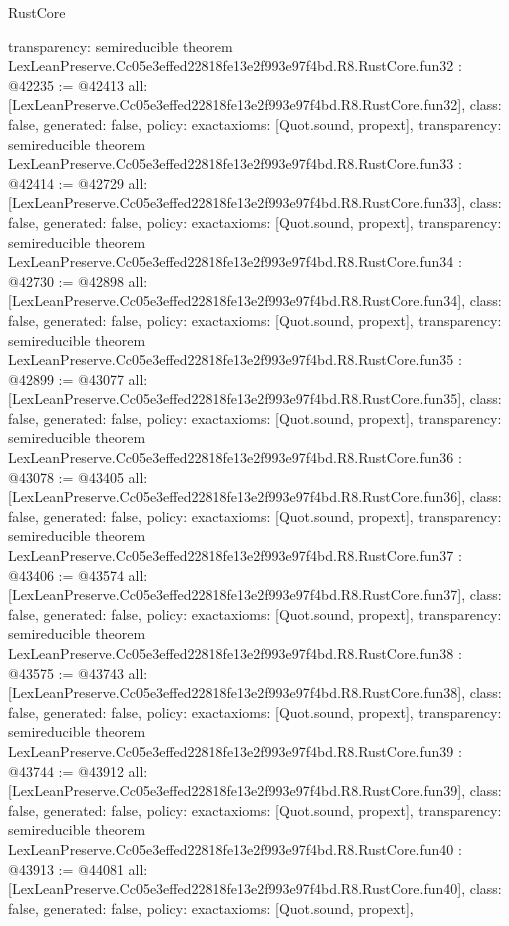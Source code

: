 \begin{lexlean}{RustCore}
\begin{coremodule}
{  transparency: semireducible
}
theorem LexLeanPreserve.Cc05e3effed22818fe13e2f993e97f4bd.R8.RustCore.fun32 : @42235 := @42413 {
  all: [LexLeanPreserve.Cc05e3effed22818fe13e2f993e97f4bd.R8.RustCore.fun32],
  class: false,
  generated: false,
  policy: exact{axioms: [Quot.sound, propext]},
  transparency: semireducible
}
theorem LexLeanPreserve.Cc05e3effed22818fe13e2f993e97f4bd.R8.RustCore.fun33 : @42414 := @42729 {
  all: [LexLeanPreserve.Cc05e3effed22818fe13e2f993e97f4bd.R8.RustCore.fun33],
  class: false,
  generated: false,
  policy: exact{axioms: [Quot.sound, propext]},
  transparency: semireducible
}
theorem LexLeanPreserve.Cc05e3effed22818fe13e2f993e97f4bd.R8.RustCore.fun34 : @42730 := @42898 {
  all: [LexLeanPreserve.Cc05e3effed22818fe13e2f993e97f4bd.R8.RustCore.fun34],
  class: false,
  generated: false,
  policy: exact{axioms: [Quot.sound, propext]},
  transparency: semireducible
}
theorem LexLeanPreserve.Cc05e3effed22818fe13e2f993e97f4bd.R8.RustCore.fun35 : @42899 := @43077 {
  all: [LexLeanPreserve.Cc05e3effed22818fe13e2f993e97f4bd.R8.RustCore.fun35],
  class: false,
  generated: false,
  policy: exact{axioms: [Quot.sound, propext]},
  transparency: semireducible
}
theorem LexLeanPreserve.Cc05e3effed22818fe13e2f993e97f4bd.R8.RustCore.fun36 : @43078 := @43405 {
  all: [LexLeanPreserve.Cc05e3effed22818fe13e2f993e97f4bd.R8.RustCore.fun36],
  class: false,
  generated: false,
  policy: exact{axioms: [Quot.sound, propext]},
  transparency: semireducible
}
theorem LexLeanPreserve.Cc05e3effed22818fe13e2f993e97f4bd.R8.RustCore.fun37 : @43406 := @43574 {
  all: [LexLeanPreserve.Cc05e3effed22818fe13e2f993e97f4bd.R8.RustCore.fun37],
  class: false,
  generated: false,
  policy: exact{axioms: [Quot.sound, propext]},
  transparency: semireducible
}
theorem LexLeanPreserve.Cc05e3effed22818fe13e2f993e97f4bd.R8.RustCore.fun38 : @43575 := @43743 {
  all: [LexLeanPreserve.Cc05e3effed22818fe13e2f993e97f4bd.R8.RustCore.fun38],
  class: false,
  generated: false,
  policy: exact{axioms: [Quot.sound, propext]},
  transparency: semireducible
}
theorem LexLeanPreserve.Cc05e3effed22818fe13e2f993e97f4bd.R8.RustCore.fun39 : @43744 := @43912 {
  all: [LexLeanPreserve.Cc05e3effed22818fe13e2f993e97f4bd.R8.RustCore.fun39],
  class: false,
  generated: false,
  policy: exact{axioms: [Quot.sound, propext]},
  transparency: semireducible
}
theorem LexLeanPreserve.Cc05e3effed22818fe13e2f993e97f4bd.R8.RustCore.fun40 : @43913 := @44081 {
  all: [LexLeanPreserve.Cc05e3effed22818fe13e2f993e97f4bd.R8.RustCore.fun40],
  class: false,
  generated: false,
  policy: exact{axioms: [Quot.sound, propext]},
}
\end{coremodule}
\end{lexlean}
